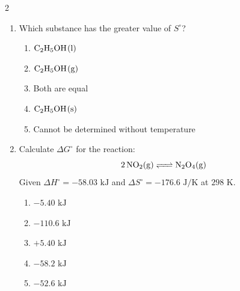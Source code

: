 \documentclass[12pt,letterpaper]{article}
\begin{document}
\begin{multicols*}{2}
\begin{enumerate}
        \item Which substance has the greater value of $S^\circ$? %
            \begin{enumerate}
                \item $\ce{C2H5OH(l)}$
                \item $\ce{C2H5OH(g)}$
                \item Both are equal
                \item $\ce{C2H5OH(s)}$
                \item Cannot be determined without temperature
            \end{enumerate}

        \item Calculate $\Delta G^\circ$ for the reaction:
            \begin{equation*}
                \ce{2NO2(g) <=> N2O4(g)}
            \end{equation*}
            Given $\Delta H^\circ = -58.03\text{ kJ}$ and $\Delta S^\circ = -176.6\text{ J/K}$ at $298\text{ K}$. %
            \begin{enumerate}
                \item $-5.40\text{ kJ}$
                \item $-110.6\text{ kJ}$
                \item $+5.40\text{ kJ}$
                \item $-58.2\text{ kJ}$
                \item $-52.6\text{ kJ}$
            \end{enumerate}


\end{enumerate}
\end{multicols*}
\end{document}
